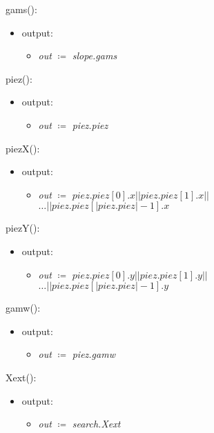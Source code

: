 \documentclass[12pt, titlepage]{article}
\begin{document}
\noindent gams():
\begin{itemize}
	\item output:
	\begin{itemize}
		\item[] \textit{out} $\coloneqq$ \textit{slope.gams}\\
	\end{itemize}
\end{itemize}

\noindent piez():
\begin{itemize}
	\item output:
	\begin{itemize}
		\item[] \textit{out} $\coloneqq$ \textit{piez.piez}\\
	\end{itemize}
\end{itemize}

\noindent piezX():
\begin{itemize}
	\item output:
	\begin{itemize}
		\item[] \textit{out} $\coloneqq$ $piez.piez[0].x || 
		piez.piez[1].x ||$\\$ \dots || piez.piez[| 
		piez.piez|-1].x$\\
	\end{itemize}
\end{itemize}

\noindent piezY():
\begin{itemize}
	\item output:
	\begin{itemize}
		\item[] \textit{out} $\coloneqq$ $piez.piez[0].y || 
		piez.piez[1].y ||$\\$ \dots || piez.piez[| 
		piez.piez|-1].y$\\
	\end{itemize}
\end{itemize}

\noindent gamw():
\begin{itemize}
	\item output:
	\begin{itemize}
		\item[] \textit{out} $\coloneqq$ \textit{piez.gamw}\\
	\end{itemize}
\end{itemize}

\noindent Xext():
\begin{itemize}
	\item output:
	\begin{itemize}
		\item[] \textit{out} $\coloneqq$ \textit{search.Xext}\\
	\end{itemize}
\end{itemize}
\end{document}
